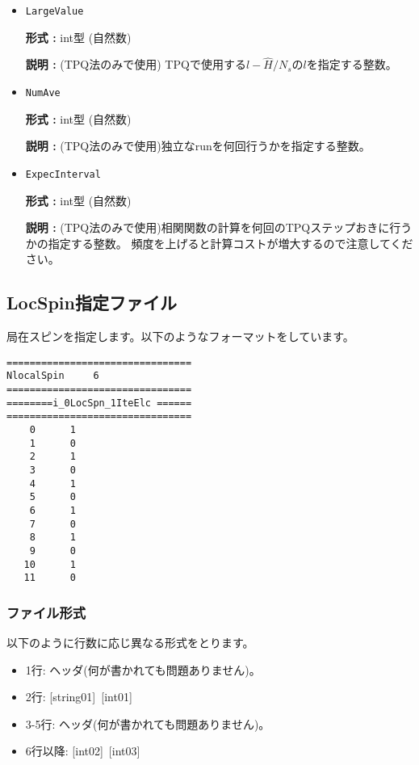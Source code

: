 \begin{itemize}
\item \verb|LargeValue|

{\bf 形式 :} int型 (自然数)

{\bf 説明 :} (TPQ法のみで使用) TPQで使用する$l-\hat{H}/N_{s}$の$l$を指定する整数。
 
\item \verb|NumAve|

{\bf 形式 :} int型 (自然数)

{\bf 説明 :} (TPQ法のみで使用)独立なrunを何回行うかを指定する整数。

\item \verb|ExpecInterval|

{\bf 形式 :} int型 (自然数)

{\bf 説明 :} (TPQ法のみで使用)相関関数の計算を何回のTPQステップおきに行うかの指定する整数。
頻度を上げると計算コストが増大するので注意してください。
 
 \end{itemize}


\newpage
\subsection{LocSpin指定ファイル}
\label{Subsec:locspn}
局在スピンを指定します。以下のようなフォーマットをしています。\\
\begin{minipage}{10cm}
\begin{screen}
\begin{verbatim}
================================ 
NlocalSpin     6  
================================ 
========i_0LocSpn_1IteElc ====== 
================================ 
    0      1
    1      0
    2      1
    3      0
    4      1
    5      0
    6      1
    7      0
    8      1
    9      0
   10      1
   11      0
\end{verbatim}
\end{screen}
\end{minipage}


\subsubsection{ファイル形式}
以下のように行数に応じ異なる形式をとります。
 \begin{itemize}
   \item  1行:  ヘッダ(何が書かれても問題ありません)。
   \item  2行:   [string01]~[int01]
   \item  3-5行:  ヘッダ(何が書かれても問題ありません)。
   \item  6行以降:  [int02]~[int03]
  \end{itemize}
